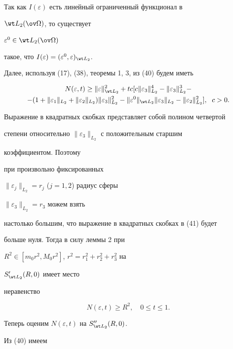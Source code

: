 Так как $I(\varepsilon)$ есть линейный ограниченный функционал в 


$\wt L_2(\ov\Omega)$, то существует 


$\varepsilon^0\in\wt L_2(\ov\Omega)$ 


такое, что $I(\varepsilon)=(\varepsilon^0,\varepsilon)_{\wt L_2}$. 


Далее, используя (17), (38), теоремы 1, 3, из (40) будем иметь 


\begin{multline} 


N(\varepsilon,t)\ge \|\varepsilon\|^2_{\wt L_2}+tc[c 


\|\varepsilon_3\|^4_{L_2}-\|\varepsilon_3\|^3_{L_2}- \\


-(1+\|\varepsilon_1\|_{L_2}+\|\varepsilon_2\|_{L_2}) 


\|\varepsilon_3\|^2_{L_2}-\|\varepsilon^0\|_{\wt L_2} 


\|\varepsilon_3\|_{L_2}-\|\varepsilon_2\|^2_{L_2}], \ \; c>0. 


\end{multline} 


Выражение в квадратных скобках представляет собой полином четвертой 


степени относительно $\|\varepsilon_3\|_{L_2}$ с положительным старшим 


коэффициентом. Поэтому 


при произвольно фиксированных 


$\|\varepsilon_j\|_{L_2}=r_j$ ($j=1,2$) радиус сферы 


$\|\varepsilon_3\|_{L_2}=r_3$ можем взять 


настолько большим, что выражение в квадратных скобках в (41) будет 


больше нуля. Тогда в силу леммы 2 при


$R^2\in[m_0r^2,M_0r^2]$, $r^2=r^2_1+r^2_2+r^2_3$ на 


$S'_{\wt L_2}(R,0)$ имеет место 


неравенство 


\begin{equation} 


N(\varepsilon,t)\ge R^2,\quad 0\le t\le 1. 


\end{equation} 


Теперь оценим $N(\varepsilon,t)$ на $S''_{\wt L_2}(R,0)$. 


Из (40) имеем 


